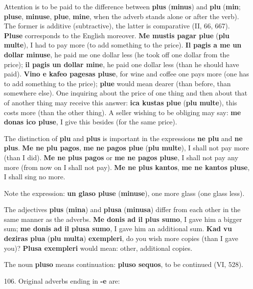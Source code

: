 Attention is to be paid to the difference between \textbf{plus} (\textbf{minus}) and \textbf{plu} (\textbf{min}; \textbf{pluse}, \textbf{minuse}, \textbf{plue}, \textbf{mine}, when the adverb stands alone or after the verb). The former is additive (subtractive), the latter is comparative (II, 66, 667). \textbf{Pluse} corresponds to the English moreover. \textbf{Me mustis pagar plue }(\textbf{plu multe}), I had to pay more (to add something to the price). \textbf{Il pagis a me un dollar minuse}, he paid me one dollar less (he took off one dollar from the price); \textbf{il pagis un dollar mine}, he paid one dollar less (than he should have paid). \textbf{Vino e kafeo pagesas pluse}, for wine and coffee one pays more (one has to add something to the price); \textbf{plue} would mean dearer (than before, than somewhere else). One inquiring about the price of one thing and then about that of another thing may receive this answer: \textbf{ica kustas plue }(\textbf{plu multe}), this costs more (than the other thing). A seller wishing to be obliging may say: \textbf{me donas ico pluse}, I give this besides (for the same price).

The distinction of \textbf{plu} and \textbf{plus} is important in the expressions \textbf{ne plu} and \textbf{ne plus}. \textbf{Me ne plu pagos}, \textbf{me ne pagos plue} (\textbf{plu multe}), I shall not pay more (than I did). \textbf{Me ne plus pagos} or \textbf{me ne pagos pluse}, I shall not pay any more (from now on I shall not pay). \textbf{Me ne plus kantos}, \textbf{me ne kantos pluse}, I shall sing no more.

Note the expression: \textbf{un glaso pluse} (\textbf{minuse}), one more glass (one glass less).

The adjectives \textbf{plus} (\textbf{mina}) and \textbf{plusa} (\textbf{minusa}) differ from each other in the same manner as the adverbs. \textbf{Me donis ad il plus sumo}, I gave him a bigger sum; \textbf{me donis ad il plusa sumo}, I gave him an additional sum. \textbf{Kad vu deziras plua }(\textbf{plu multa})\textbf{ exempleri}, do you wish more copies (than I gave you)? \textbf{Plusa exempleri} would mean: other, additional copies.

The noun \textbf{pluso} means continuation: \textbf{pluso sequos}, to be continued (VI, 528).

106. Original adverbs ending in \textbf{-e} are:

